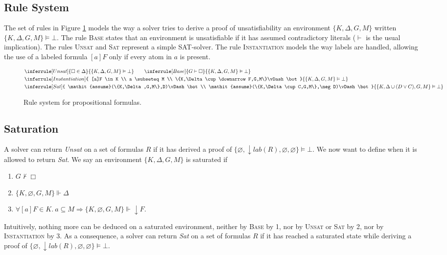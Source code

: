 \documentclass[a4paper,11pt]{article}
\newcommand{\T}{\mathit{lab}}
\newcommand{\A}{\mathit{assume}}
\newcommand{\impbox}{\vDash\bot}
\begin{document}
\subsection{Rule System}
The set of rules in Figure \ref{p-sr} models the way a solver tries to derive a proof of unsatisfiability
an environment $\{K,\Delta,G,M\}$ written $\{K,\Delta,G,M\}\impbox$. The rule \textsc{Base} states that
an environment is unsatisfiable if it has assumed contradictory literals ($\vdash$ is the usual
implication). The rules \textsc{Unsat} and
\textsc{Sat} represent a simple SAT-solver. The rule \textsc{Instantiation} models the way labels
are handled, allowing the use of a labeled formula $[a]F$ only if every atom in $a$ is present.

\begin{figure}
\begin{eqnarray*}
&
\inferrule [Unsat]{
\Box\in \Delta
}{
\{K,\Delta,G,M\}\impbox
}\qquad
\inferrule [Base]{
G\vdash\Box
}{
\{K,\Delta,G,M\}\impbox
}\\
&
\inferrule [Instantiation]{
[a]F \in K  \\ a \subseteq M \\ \{K,\Delta\cup\downarrow F,G,M\}\impbox
}{
\{K,\Delta,G,M\}\impbox
}\\
&
\inferrule [Sat]{
\A(\{K,\Delta,G,M\},D)\impbox\\ \A(\{K,\Delta\cup C,G,M\},\neg D)\impbox
}{
\{K,\Delta\cup(D\vee C),G,M\}\impbox
}
\end{eqnarray*}
\caption{\label{p-sr} Rule system for propositional formulas.}
\end{figure}

\subsection{Saturation}
A solver can return \emph{Unsat} on a set of formulas $R$ if it has derived a proof of
$\{\varnothing,\downarrow\T(R),\varnothing,\varnothing\}\impbox$. We now want to define when
it is allowed to return \emph{Sat}. We say an environment $\{K,\Delta,G,M\}$ is saturated if
\begin{enumerate}
 \item $G\nvdash\Box$
 \item $\{K,\varnothing,G,M\}\Vdash\Delta$
 \item $\forall [a]F\in K.\ a\subseteq M\Rightarrow \{K,\varnothing,G,M\}\Vdash\downarrow F$.
\end{enumerate}
Intuitively, nothing more can be deduced on a saturated environment, neither by \textsc{Base}
by 1, nor by \textsc{Unsat} or \textsc{Sat} by 2, nor by \textsc{Instantiation} by 3.
As a consequence, a solver can return \emph{Sat} on a set of formulas $R$ if it has reached
a saturated state while deriving a proof of
$\{\varnothing,\downarrow\T(R),\varnothing,\varnothing\}\impbox$.
\end{document}
